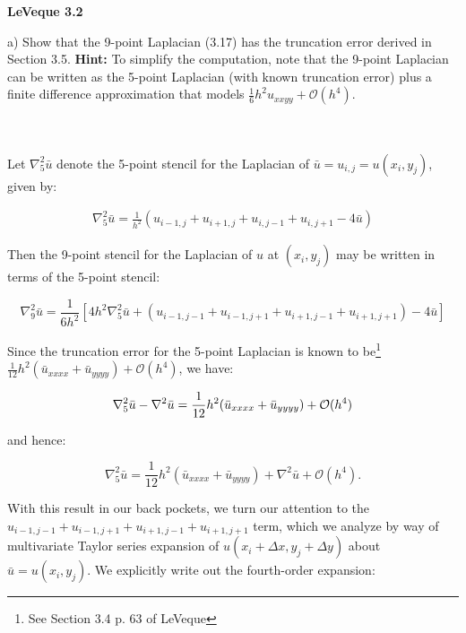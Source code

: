 \textbf{LeVeque 3.2} 

a) Show that the 9-point Laplacian (3.17) has the truncation error derived in Section 3.5. \textbf{Hint: } To simplify
   the computation, note that the 9-point Laplacian can be written as the 5-point Laplacian (with known truncation 
   error) plus a finite difference approximation that models $\frac{1}{6} h^2 u_{xxyy} + \mathcal{O}(h^4)$.

\begin{solution}\ \\\\
   Let $\nabla_5^2 \bar{u}$ denote the 5-point stencil for the Laplacian of $\bar{u} = u_{i,j}= u(x_i, y_j) $, given by:
   
   \begin{align*}
      \nabla_5^2 \bar{u} = \frac{1}{h^2} (u_{i-1, j} + u_{i+1, j} + u_{i, j-1} + u_{i, j+1} - 4\bar{u})
   \end{align*}

   Then the 9-point stencil for the Laplacian of $u$ at $(x_i, y_j)$ may be written in terms of the 5-point stencil:

   \begin{equation}
      \nabla_9^2 \bar{u} = \frac{1}{6h^2} [4h^2 \nabla_5^2 \bar{u} + (u_{i-1, j-1} + u_{i-1, j+1} + u_{i+1, j-1} + u_{i+1, j+1}) - 4\bar{u}]
   \end{equation}

   Since the truncation error for the 5-point Laplacian is known to be\footnote{
      See Section 3.4 p. 63 of LeVeque
   } \linebreak
   $\frac{1}{12} h^2 (\bar{u}_{xxxx} + \bar{u}_{yyyy}) + \mathcal{O}(h^4)$, we have:

   $$
      \nabla_5^2 \bar{u} - \nabla^2 \bar{u} = \frac{1}{12} h^2 (\bar{u}_{xxxx} + \bar{u}_{yyyy}) + \mathcal{O}(h^4) \\
   $$

   and hence:

   \begin{equation}
      \nabla_5^2 \bar{u} = \frac{1}{12} h^2 (\bar{u}_{xxxx} + \bar{u}_{yyyy}) + \nabla^2 \bar{u}  + \mathcal{O}(h^4).
   \end{equation}

   With this result in our back pockets, we turn our attention to the \linebreak
   $u_{i-1, j-1} + u_{i-1, j+1} + u_{i+1, j-1} + u_{i+1, j+1}$ term, which we analyze by way of multivariate Taylor 
   series expansion of $u(x_i + \Delta x, y_j + \Delta y)$ about $\bar{u} = u(x_i, y_j)$. We explicitly write out the
   fourth-order expansion:


\end{solution}
